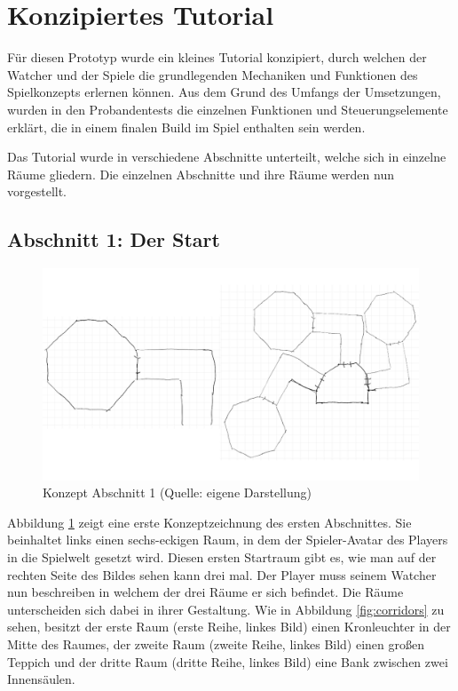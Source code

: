 \section{Konzipiertes Tutorial}
Für diesen Prototyp wurde ein kleines Tutorial konzipiert, durch welchen der Watcher und der Spiele die grundlegenden Mechaniken und Funktionen des Spielkonzepts erlernen können. Aus dem Grund des Umfangs der Umsetzungen, wurden in den Probandentests die einzelnen Funktionen und Steuerungselemente erklärt, die in einem finalen Build im Spiel enthalten sein werden.

Das Tutorial wurde in verschiedene Abschnitte unterteilt, welche sich in einzelne Räume gliedern. Die einzelnen Abschnitte und ihre Räume werden nun vorgestellt.
\subsection{Abschnitt 1: Der Start}

\begin{figure}[ht]
\centering
\includegraphics[width=1\linewidth]{content/pictures/Abschnitt_Concept_00.png}
\caption{Konzept Abschnitt 1 (Quelle: eigene Darstellung)}
\label{fig:section_00_concept}
\end{figure}

Abbildung \ref{fig:section_00_concept} zeigt eine erste Konzeptzeichnung des ersten Abschnittes. Sie beinhaltet links einen sechs-eckigen Raum, in dem der Spieler-Avatar des Players in die Spielwelt gesetzt wird. Diesen ersten Startraum gibt es, wie man auf der rechten Seite des Bildes sehen kann drei mal. Der Player muss seinem Watcher nun beschreiben in welchem der drei Räume er sich befindet. Die Räume unterscheiden sich dabei in ihrer Gestaltung. Wie in Abbildung \ref{fig:corridors} zu sehen, besitzt der erste Raum (erste Reihe, linkes Bild) einen Kronleuchter in der Mitte des Raumes, der zweite Raum (zweite Reihe, linkes Bild) einen großen Teppich und der dritte Raum (dritte Reihe, linkes Bild) eine Bank zwischen zwei Innensäulen.

